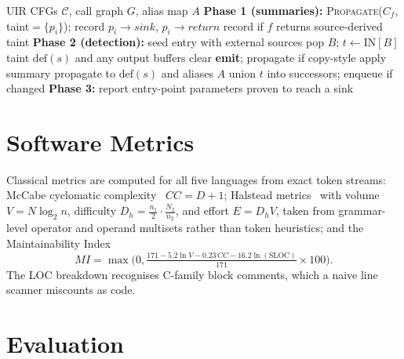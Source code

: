 \documentclass[10pt,conference]{IEEEtran}
\begin{document}
\begin{algorithm}[t]
\caption{Interprocedural Flow-Sensitive Taint Analysis}
\label{alg:taint}
\begin{algorithmic}[1]
\Require UIR CFGs $\mathcal{C}$, call graph $G$, alias map $A$
\State \textbf{Phase 1 (summaries):}
    \State \textsc{Propagate}($C_f$, taint$=\{p_i\}$); record
    $p_i\!\to\!\mathit{sink}$, $p_i\!\to\!\mathit{return}$
  \EndFor
  \State record if $f$ returns source-derived taint
\EndFor
\State \textbf{Phase 2 (detection):}
  \State seed entry with external sources
    \State pop $B$; $t\gets\mathrm{IN}[B]$
       taint $\mathrm{def}(s)$ and any output buffers \EndIf
       clear \EndIf
       \textbf{emit}; propagate if copy-style \EndIf
       apply summary \EndIf
      \State propagate to $\mathrm{def}(s)$ and aliases $A$
    \EndFor
    \State union $t$ into successors; enqueue if changed
  \EndWhile
\EndFor
\State \textbf{Phase 3:} report entry-point parameters proven to reach a sink
\end{algorithmic}
\end{algorithm}

\section{Software Metrics}
\label{sec:metrics}
Classical metrics are computed for all five languages from exact token
streams: McCabe cyclomatic complexity~\cite{mccabe} $CC=D+1$; Halstead
metrics~\cite{halstead} with volume $V=N\log_2 n$, difficulty
$D_h=\frac{n_1}{2}\cdot\frac{N_2}{n_2}$, and effort $E=D_hV$, taken from
grammar-level operator and operand multisets rather than token heuristics;
and the Maintainability Index
\begin{equation}
MI=\max\!\Big(0,\tfrac{171-5.2\ln V-0.23\,CC-16.2\ln(\mathrm{SLOC})}{171}\times100\Big).
\end{equation}
The LOC breakdown recognises C-family block comments, which a naive line
scanner miscounts as code.

\section{Evaluation}
\label{sec:eval}
\end{document}
